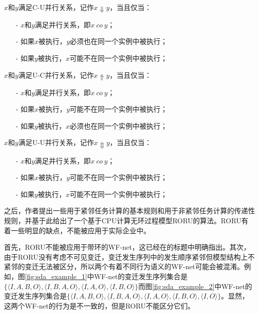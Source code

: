\begin{definition}\label{def:c_u_concurrency}
$x$和$y$满足C-U并行关系，记作$x\Downarrow y$，当且仅当：
  \begin{itemize}
    \item[-] $x$和$y$满足并行关系，即$x~co~y$；
    \item[-] 如果$x$被执行，$y$必须也在同一个实例中被执行；
    \item[-] 如果$y$被执行，$x$可能不在同一个实例中被执行；
  \end{itemize}
\end{definition}

\begin{definition}\label{def:u_c_concurrency}
$x$和$y$满足U-C并行关系，记作$x\Uparrow y$，当且仅当：
  \begin{itemize}
    \item[-] $x$和$y$满足并行关系，即$x~co~y$；
    \item[-] 如果$x$被执行，$y$可能不在同一个实例中被执行；
    \item[-] 如果$y$被执行，$x$必须也在同一个实例中被执行；
  \end{itemize}
\end{definition}

\begin{definition}\label{def:u_u_concurrency}
$x$和$y$满足U-U并行关系，记作$x\Updownarrow y$，当且仅当：
  \begin{itemize}
    \item[-] $x$和$y$满足并行关系，即$x~co~y$；
    \item[-] 如果$x$被执行，$y$可能不在同一个实例中被执行；
    \item[-] 如果$y$被执行，$x$可能不在同一个实例中被执行；
  \end{itemize}
\end{definition}

之后，作者提出一些用于紧邻任务计算的基本规则和用于非紧邻任务计算的传递性规则，并基于此给出了一个基于CPU计算无环过程模型RORU的算法。RORU有着一些明显的缺点，不能被应用于实际企业中。

首先，RORU不能被应用于带环的WF-net，这已经在的标题中明确指出。其次，由于RORU没有考虑不可见变迁，变迁发生序列中的发生顺序紧邻但模型结构上不紧邻的变迁无法被区分，所以两个有着不同行为语义的WF-net可能会被混淆。例如，图\ref{fig:sda_example_1}中WF-net的变迁发生序列集合是$\{\langle I,A,B,O\rangle,\langle I,B,A,O\rangle,\langle I,A,O\rangle,\langle I,B,O\rangle\}$而图\ref{fig:sda_example_2}中WF-net的变迁发生序列集合是$\{\langle I,A,B,O\rangle,\langle I,B,A,O\rangle,\langle I,A,O\rangle,\langle I,B,O\rangle,\langle I,O\rangle\}$。显然，这两个WF-net的行为是不一致的，但是RORU不能区分它们。


